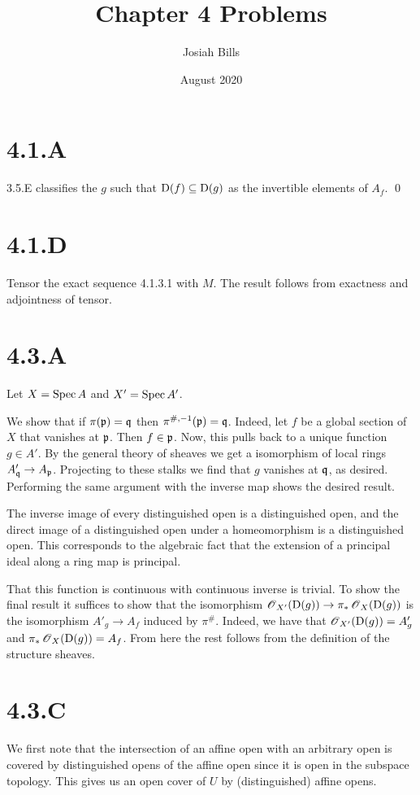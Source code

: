 \documentclass{article}
\title{Chapter 4 Problems}
\author{Josiah Bills}
\date{August 2020}
\begin{document}
\maketitle

\section{4.1.A}
3.5.E classifies the $g$ such that $\operatorname{D}(f) \subseteq \operatorname{D}(g)$
as the invertible elements of $A_f$. \qed

\section{4.1.D}
Tensor the exact sequence 4.1.3.1 with $M$. The result
follows from exactness and adjointness of tensor.

\section{4.3.A}
Let $X=\operatorname{Spec} A$ and $X'=\operatorname{Spec} A'$.

We show that if $\pi(\mathfrak{p})=\mathfrak{q}$ then $\pi^{\#,-1}(\mathfrak{p})=\mathfrak{q}$. Indeed,
let $f$ be a global section of $X$ that
vanishes at $\mathfrak{p}$. Then $f \in \mathfrak{p}$. Now, this
pulls back to a unique function $g \in A'$. By the general theory
of sheaves we get a isomorphism of local rings $A'_{\mathfrak{q}} \to A_{\mathfrak{p}}$.
Projecting to these stalks we find that $g$ vanishes at
$\mathfrak{q}$, as desired. Performing the same argument with the
inverse map shows the desired result.

The inverse image of every distinguished open is a distinguished open, and the
direct image of a distinguished open under a homeomorphism is a distinguished
open. This corresponds to the algebraic fact that the extension of a principal
ideal along a ring map is principal.

That this function is continuous with continuous inverse is trivial. To show
the final result it suffices to show that the isomorphism
$\operatorname{\mathscr{O}}_{X'}(\operatorname{D}(g)) \to \pi_*\operatorname{\mathscr{O}}_X(\operatorname{D}(g))$ is the isomorphism $A'_g \to A_f$ induced by
$\pi^{\#}$. Indeed, we have that $\operatorname{\mathscr{O}}_{X'}(\operatorname{D}(g))=A'_g$ and
$\pi_*\operatorname{\mathscr{O}}_X(\operatorname{D}(g))=A_f$. From here the rest follows from the definition of the
structure sheaves.

\section{4.3.C}
We first note that the intersection of an affine open with an arbitrary open is
covered by distinguished opens of the affine open since it is open in the
subspace topology. This gives us an open cover of $U$ by
(distinguished) affine opens.
\end{document}
